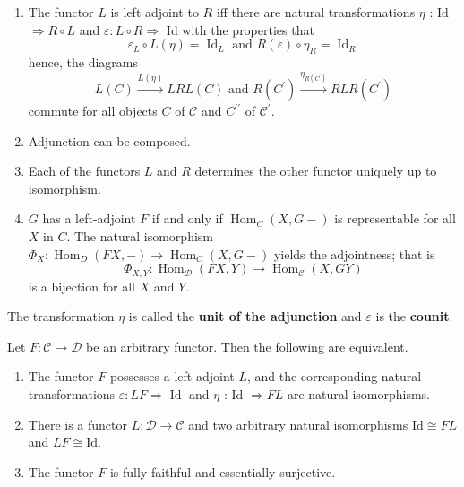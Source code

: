 \begin{example}
\begin{prop}
    \begin{enumerate}
      \item The functor $L$ is left adjoint to $R$ iff there are natural transformations $\eta$ : Id $\Rightarrow R \circ L$ and $\varepsilon: L \circ R \Rightarrow$ Id with the properties that
      $$
      \varepsilon_L \circ L(\eta)=\operatorname{Id}_L \text { and } R(\varepsilon) \circ \eta_R=\operatorname{Id}_R
      $$
      hence, the diagrams
      $$
      L(C) \xrightarrow{L(\eta)} L R L(C) \text { and } R\left(C^{\prime}\right) \xrightarrow{\eta_{R\left(C^{\prime}\right)}} R L R\left(C^{\prime}\right)
      $$
      commute for all objects $C$ of $\mathcal{C}$ and $C^{\prime \prime}$ of $\mathcal{C}^{\prime}$.
      \item Adjunction can be composed.
      \item Each of the functors $L$ and $R$ determines the other functor uniquely up to isomorphism.
      \item $G$ has a left-adjoint $F$ if and only if $\operatorname{Hom}_C(X, G-)$ is representable for all $X$ in $C$. The natural isomorphism $\Phi_X: \operatorname{Hom}_D(F X,-) \rightarrow \operatorname{Hom}_C(X, G-)$ yields the adjointness; that is
$$
\Phi_{X, Y}: \operatorname{Hom}_{\mathcal{D}}(F X, Y) \rightarrow \operatorname{Hom}_{\mathcal{C}}(X, G Y)
$$
is a bijection for all $X$ and $Y$.
    \end{enumerate}
\end{prop}
The transformation $\eta$ is called the \textbf{unit of the adjunction} and $\varepsilon$ is the \textbf{counit}.


\begin{theo}
Let $F: \mathcal{C} \rightarrow \mathcal{D}$ be an arbitrary functor. Then the following are equivalent.
\begin{enumerate}
    \item The functor $F$ possesses a left adjoint $L$, and the corresponding natural transformations $\varepsilon: L F \Rightarrow \operatorname{Id}$ and $\eta$ : Id $\Rightarrow F L$ are natural isomorphisms.
    \item There is a functor $L: \mathcal{D} \rightarrow \mathcal{C}$ and two arbitrary natural isomorphisms $\mathrm{Id} \cong F L$ and $L F \cong \mathrm{Id}$.
    \item The functor $F$ is fully faithful and essentially surjective.
\end{enumerate}
\end{theo}


\end{example}
